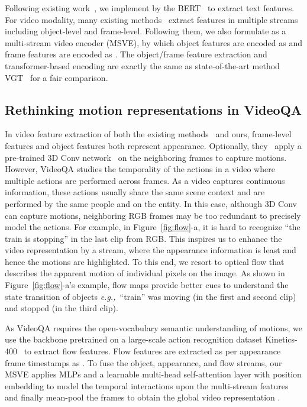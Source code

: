 \documentclass[sigconf]{acmart}
\newcommand{\eg}{\emph{e.g.,~}}
\begin{document}
Following existing work~\cite{xiao2022vgt, li2022invariant}, we implement  by the BERT~\cite{devlin2018bert} to extract text features. For video modality, many existing methods~\cite{xiao2022vgt, xiao2022hqga} extract features in multiple streams including object-level and frame-level. Following them, we also formulate  as a multi-stream video encoder (MSVE), by which object features are encoded as  and frame features are encoded as . The object/frame feature extraction and transformer-based encoding are exactly the same as state-of-the-art method VGT~\cite{xiao2022vgt} for a fair comparison. 






\subsection{Rethinking motion representations in VideoQA}
\label{sec:flow}
In video feature extraction of both the existing methods~\cite{xiao2022vgt, xiao2022hqga, le2020hierarchical} and ours, frame-level features  and object features  both represent appearance. 
Optionally, they~\cite{xiao2022hqga,le2020hierarchical} apply a pre-trained 3D Conv network~\cite{carreira2017quo} on the neighboring frames to capture motions.
However, VideoQA studies the temporality of the actions in a video where multiple actions are performed across frames. As a video captures continuous information, these actions usually share the same scene context and are performed by the same people and on the entity. 
In this case, although 3D Conv can capture motions, neighboring RGB frames may be too redundant to precisely model the actions. For example, in Figure~\ref{fig:flow}-a, it is hard to recognize ``the train is stopping'' in the last clip from RGB. 
This inspires us to enhance the video representation by a stream, where the appearance information is least and hence the motions are highlighted. 
To this end, we resort to optical flow that describes the apparent motion of individual pixels on the image. As shown in  Figure~\ref{fig:flow}-a's example, flow maps provide better cues to understand the state transition of objects \eg ``train'' was moving (in the first and second clip) and stopped (in the third clip). 




As VideoQA requires the open-vocabulary semantic understanding of motions, we use the backbone pretrained on a large-scale action recognition dataset Kinetics-400~\cite{kay2017kinetics} to extract flow features.
Flow features are extracted as per appearance frame timestamps as . To fuse the object, appearance, and flow streams, our MSVE applies MLPs and a learnable multi-head self-attention layer  with position embedding to model the temporal interactions upon the multi-stream features and finally mean-pool the frames to obtain the global video representation .
\end{document}

